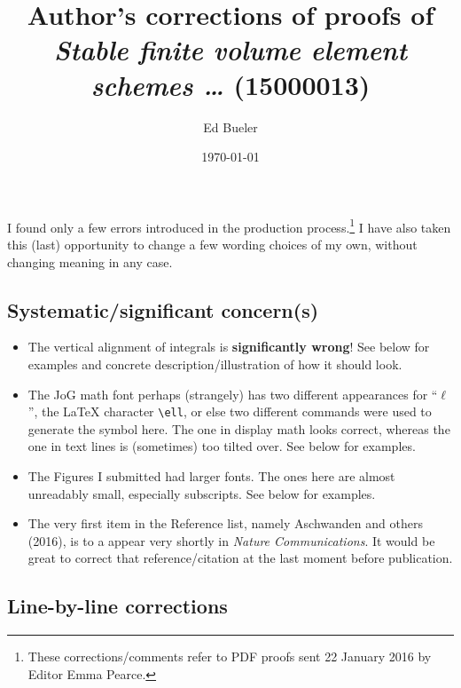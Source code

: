 \documentclass[11pt,reqno]{amsart}
\title[Author's corrections of proofs of 15000013]{Author's corrections of proofs of \\ \emph{Stable finite volume element schemes \dots} (15000013)}
\author{Ed Bueler}
\date{\today}
\begin{document}
\maketitle

\thispagestyle{empty}

I found only a few errors introduced in the production process.\footnote{These corrections/comments refer to PDF proofs sent 22 January 2016 by Editor Emma Pearce.}  I have also taken this (last) opportunity to change a few wording choices of my own, without changing meaning in any case.

\subsection*{Systematic/significant concern(s)}

\begin{itemize}
\item  The vertical alignment of integrals is \textbf{significantly wrong}!  See below for examples and concrete description/illustration of how it should look.
\item  The JoG math font perhaps (strangely) has two different appearances for ``$\ell$'', the LaTeX character \verb|\ell|, or else two different commands were used to generate the symbol here.  The one in display math looks correct, whereas the one in text lines is (sometimes) too tilted over.  See below for examples.
\item  The Figures I submitted had larger fonts.  The ones here are almost unreadably small, especially subscripts.  See below for examples.
\item  The very first item in the Reference list, namely Aschwanden and others (2016), is to a appear very shortly in \emph{Nature Communications}.  It would be great to correct that reference/citation at the last moment before publication.
\end{itemize}


\subsection*{Line-by-line corrections}
\end{document}
